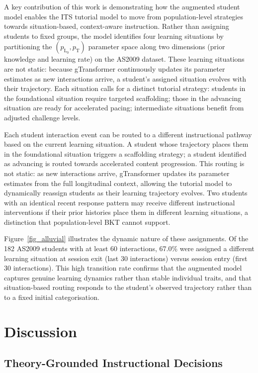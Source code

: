 \documentclass[runningheads]{llncs}
\begin{document}
A key contribution of this work is demonstrating how the augmented student model enables the ITS tutorial model to move from population-level strategies towards situation-based, context-aware instruction. Rather than assigning students to fixed groups, the model identifies four learning situations by partitioning the $(p_{\text{L}_0}, p_{\text{T}})$ parameter space along two dimensions (prior knowledge and learning rate) on the AS2009 dataset. These learning situations are not static: because gTransformer continuously updates its parameter estimates as new interactions arrive, a student's assigned situation evolves with their trajectory. Each situation calls for a distinct tutorial strategy: students in the foundational situation require targeted scaffolding; those in the advancing situation are ready for accelerated pacing; intermediate situations benefit from adjusted challenge levels.

Each student interaction event can be routed to a different instructional pathway based on the current learning situation. A student whose trajectory places them in the foundational situation triggers a scaffolding strategy; a student identified as advancing is routed towards accelerated content progression. This routing is not static: as new interactions arrive, gTransformer updates its parameter estimates from the full longitudinal context, allowing the tutorial model to dynamically reassign students as their learning trajectory evolves. Two students with an identical recent response pattern may receive different instructional interventions if their prior histories place them in different learning situations, a distinction that population-level BKT cannot support.

Figure~\ref{fig_alluvial} illustrates the dynamic nature of these assignments. Of the 182 AS2009 students with at least 60 interactions, 67.0\% were assigned a different learning situation at session exit (last 30 interactions) versus session entry (first 30 interactions). This high transition rate confirms that the augmented model captures genuine learning dynamics rather than stable individual traits, and that situation-based routing responds to the student's observed trajectory rather than to a fixed initial categorisation.

%
\section{Discussion}

\subsection{Theory-Grounded Instructional Decisions}
\end{document}
